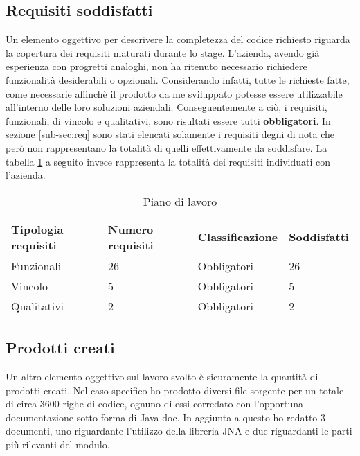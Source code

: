 \subsection{Requisiti soddisfatti}
Un elemento oggettivo per descrivere la completezza del codice richiesto riguarda la copertura dei requisiti maturati durante lo stage.
L’azienda, avendo già esperienza con progretti analoghi, non ha ritenuto necessario richiedere funzionalità 
desiderabili o opzionali. Considerando infatti, tutte le richieste fatte, come necessarie affinchè il prodotto da me sviluppato potesse essere utilizzabile
all'interno delle loro soluzioni aziendali.
Conseguentemente a ciò, i requisiti, funzionali, di vincolo e qualitativi, sono risultati essere tutti \textbf{obbligatori}.
In sezione \ref{sub-sec:req} sono stati elencati solamente i requisiti degni di nota che però non rappresentano la totalità di quelli 
effettivamente da soddisfare.
La tabella \ref{tab:req-solved} a seguito invece rappresenta la totalità dei requisiti individuati con l’azienda.
\begin{table}[h!]
    \label{tab:req-solved}
    \begin{tabularx}{\textwidth}{ | X | X | X | X | }
    \hline
    \textbf{Tipologia requisiti} & \textbf{Numero requisiti} & \textbf{Classificazione} & \textbf{Soddisfatti}\\
    \hline
    Funzionali & 26 & Obbligatori & 26 \\
    \hline
    Vincolo & 5 & Obbligatori & 5 \\
    \hline
    Qualitativi & 2 & Obbligatori & 2 \\
    \hline
    \end{tabularx}
    \caption{Piano di lavoro}
\end{table}

\subsection{Prodotti creati}
Un altro elemento oggettivo sul lavoro svolto è sicuramente la quantità di prodotti creati. 
Nel caso specifico ho prodotto diversi file sorgente per un totale di circa 3600 righe di codice, ognuno di essi corredato
con l'opportuna documentazione sotto forma di Java-doc. In aggiunta a questo ho redatto 3 documenti, uno riguardante l'utilizzo
della libreria JNA e due riguardanti le parti più rilevanti del modulo.